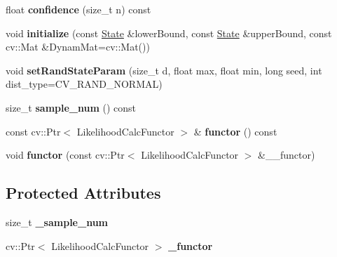 \begin{DoxyCompactItemize}
float {\bfseries confidence} (size\+\_\+t n) const
\item 
\hypertarget{classskl_1_1_particle_filter_a056fe06e6b166febf4d23d781db88bc2}{}\label{classskl_1_1_particle_filter_a056fe06e6b166febf4d23d781db88bc2} 
void {\bfseries initialize} (const \hyperlink{classskl_1_1_particle_filter_1_1_state}{State} \&lower\+Bound, const \hyperlink{classskl_1_1_particle_filter_1_1_state}{State} \&upper\+Bound, const cv\+::\+Mat \&Dynam\+Mat=cv\+::\+Mat())
\item 
\hypertarget{classskl_1_1_particle_filter_a2814b29008d805d64860a1bfe5046c13}{}\label{classskl_1_1_particle_filter_a2814b29008d805d64860a1bfe5046c13} 
void {\bfseries set\+Rand\+State\+Param} (size\+\_\+t d, float max, float min, long seed, int dist\+\_\+type=C\+V\+\_\+\+R\+A\+N\+D\+\_\+\+N\+O\+R\+M\+AL)
\item 
\hypertarget{classskl_1_1_particle_filter_ac340d5aaeb05ab64726f9219068a7be6}{}\label{classskl_1_1_particle_filter_ac340d5aaeb05ab64726f9219068a7be6} 
size\+\_\+t {\bfseries sample\+\_\+num} () const
\item 
\hypertarget{classskl_1_1_particle_filter_ac6999a8ec64d50a15e413157046657db}{}\label{classskl_1_1_particle_filter_ac6999a8ec64d50a15e413157046657db} 
const cv\+::\+Ptr$<$ Likelihood\+Calc\+Functor $>$ \& {\bfseries functor} () const
\item 
\hypertarget{classskl_1_1_particle_filter_a9a74f9fc43a22eb4d244026152bf226a}{}\label{classskl_1_1_particle_filter_a9a74f9fc43a22eb4d244026152bf226a} 
void {\bfseries functor} (const cv\+::\+Ptr$<$ Likelihood\+Calc\+Functor $>$ \&\+\_\+\+\_\+functor)
\end{DoxyCompactItemize}
\subsection*{Protected Attributes}
\begin{DoxyCompactItemize}
\item 
\hypertarget{classskl_1_1_particle_filter_a281a0e512359ce17a5a30140f5ab5238}{}\label{classskl_1_1_particle_filter_a281a0e512359ce17a5a30140f5ab5238} 
size\+\_\+t {\bfseries \+\_\+sample\+\_\+num}
\item 
\hypertarget{classskl_1_1_particle_filter_ad80ae552b97c95fe48b35993e0b90bda}{}\label{classskl_1_1_particle_filter_ad80ae552b97c95fe48b35993e0b90bda} 
cv\+::\+Ptr$<$ Likelihood\+Calc\+Functor $>$ {\bfseries \+\_\+functor}
\end{DoxyCompactItemize}


